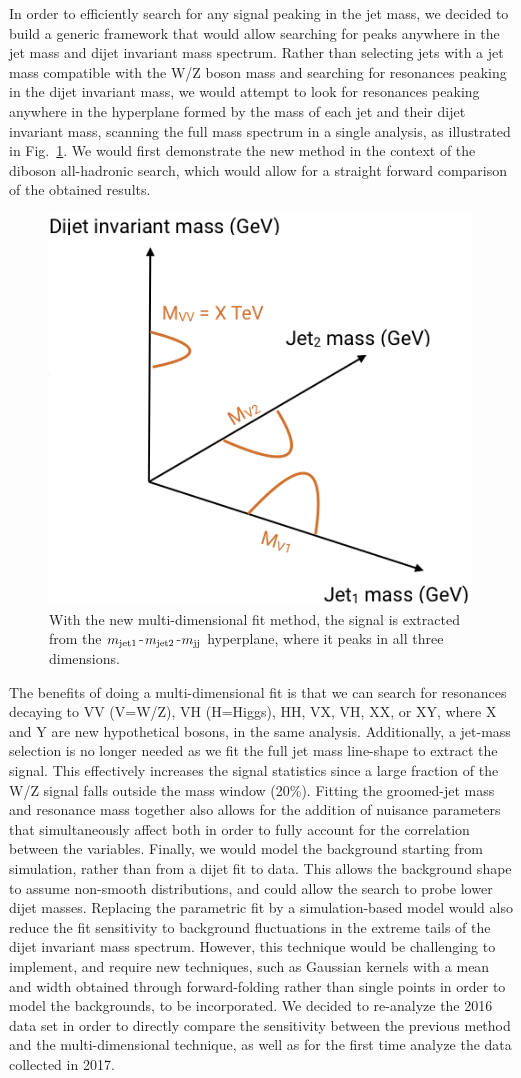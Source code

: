 \documentclass{pasa}%
\begin{document}
In order to efficiently search for any signal peaking in the jet mass, we decided to build a generic framework that would allow searching for peaks anywhere in the jet mass and dijet invariant mass spectrum.
Rather than selecting jets with a jet mass compatible with the W/Z boson mass and searching for resonances peaking in the dijet invariant mass, we would attempt to look for resonances peaking anywhere in the hyperplane formed by the mass of each jet and their dijet invariant mass, scanning the full mass spectrum in a single analysis, as illustrated in Fig.~\ref{Fig5}. We would first demonstrate the new method in the context of the diboson all-hadronic search, which would allow for a straight forward comparison of the obtained results.
\begin{figure}[h!]
\centering
 \includegraphics[width=0.49\columnwidth]{figures/3D.png}
\caption{With the new multi-dimensional fit method, the signal is extracted from the $m_{\rm{jet1}}$-$m_{\rm{jet2}}$-$m_{\rm{jj}}$ hyperplane, where it peaks in all three dimensions.}
\label{Fig5}
\end{figure}
The benefits of doing a multi-dimensional fit is that we can search for resonances decaying to VV (V=W/Z), VH (H=Higgs), HH, VX, VH, XX, or XY, where X and Y are new hypothetical bosons, in the same analysis. Additionally, a jet-mass selection is no longer needed as we fit the full jet mass line-shape to extract the signal. This effectively increases the signal statistics since a large fraction of the W/Z signal falls outside the mass window (20\%). Fitting the groomed-jet mass and resonance mass together also allows for the addition of nuisance parameters that simultaneously affect both in order to fully account for the correlation between the variables. Finally, we would model the background starting from simulation, rather than from a dijet fit to data. This allows the background shape to assume non-smooth distributions, and could allow the search to probe lower dijet masses. Replacing the parametric fit by a simulation-based model would also reduce the fit sensitivity to background fluctuations in the extreme tails of the dijet invariant mass spectrum. However, this technique would be challenging to implement, and require new techniques, such as Gaussian kernels with a mean and width obtained through forward-folding rather than single points in order to model the backgrounds, to be incorporated. We decided to re-analyze the 2016 data set in order to directly compare the sensitivity between the previous method and the multi-dimensional technique, as well as for the first time analyze the data collected in 2017.
\end{document}
